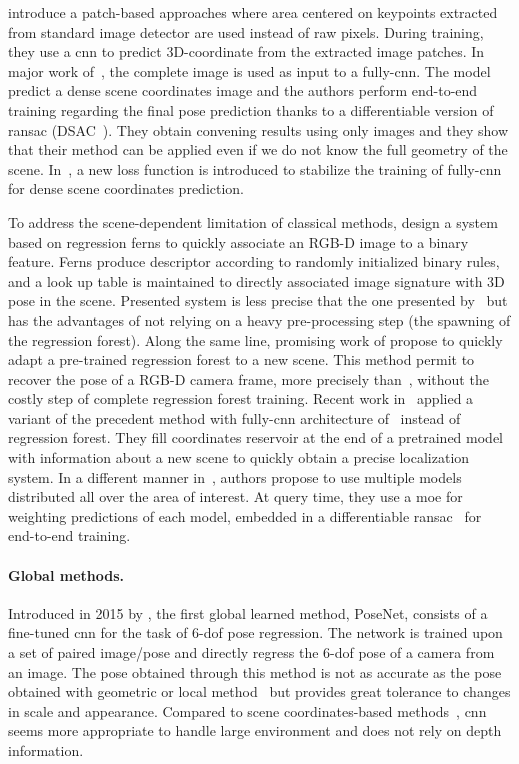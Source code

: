 \citet{Duong2018} introduce a patch-based approaches where area centered on keypoints extracted from standard image detector are used instead of raw pixels. During training, they use a \ac{cnn} to predict 3D-coordinate from the extracted image patches. In major work of~\citet{Brachmann2017b}, the complete image is used as input to a fully-\ac{cnn}. The model predict a dense scene coordinates image and the authors perform end-to-end training regarding the final pose prediction thanks to a differentiable version of \ac{ransac} (DSAC~\citep{Brachmann2017}). They obtain convening results using only images and they show that their method can be applied even if we do not know the full geometry of the scene. In~\citep{Li2018}, a new loss function is introduced to stabilize the training of fully-\ac{cnn} for dense scene coordinates prediction.

To address the scene-dependent limitation of classical methods, \citet{Glocker2015} design a system based on regression ferns to quickly associate an RGB-D image to a binary feature. Ferns produce descriptor according to randomly initialized binary rules, and a look up table is maintained to directly associated image signature with 3D pose in the scene. Presented system is less precise that the one presented by~\citet{Shotton2013} but has the advantages of not relying on a heavy pre-processing step (\ie the spawning of the regression forest). Along the same line, promising work of \citet{Cavallari, Cavallari2018} propose to quickly adapt a pre-trained regression forest to a new scene. This method permit to recover the pose of a RGB-D camera frame, more precisely than~\citet{Glocker2013,Glocker2015}, without the costly step of complete regression forest training. Recent work in~\citep{Cavallari2019} applied a variant of the precedent method with fully-\ac{cnn} architecture of~\citep{Brachmann2017b} instead of regression forest. They fill coordinates reservoir at the end of a pretrained model with information about a new scene to quickly obtain a precise localization system. In a different manner in~\citep{EricBrachmann2019}, authors propose to use multiple models distributed all over the area of interest. At query time, they use a \ac{moe} for weighting predictions of each model, embedded in a differentiable \ac{ransac}~\citep{Brachmann2017,Brachmann2019} for end-to-end training.

\paragraph{Global methods.}
\label{para:cnn_regressor}
Introduced in 2015 by \citet{Kendall2015}, the first global learned method, PoseNet, consists of a fine-tuned \ac{cnn} for the task of 6-\ac{dof} pose regression. The network is trained upon a set of paired image/pose and directly regress the 6-\ac{dof} pose of a camera from an image. The pose obtained through this method is not as accurate as the pose obtained with geometric or local method~\citep{Feng2016a,Brachmann2017b} but provides great tolerance to changes in scale and appearance. Compared to scene coordinates-based methods~\citep{Shotton2013,Li2018}, \ac{cnn} seems more appropriate to handle large environment and does not rely on depth information.

